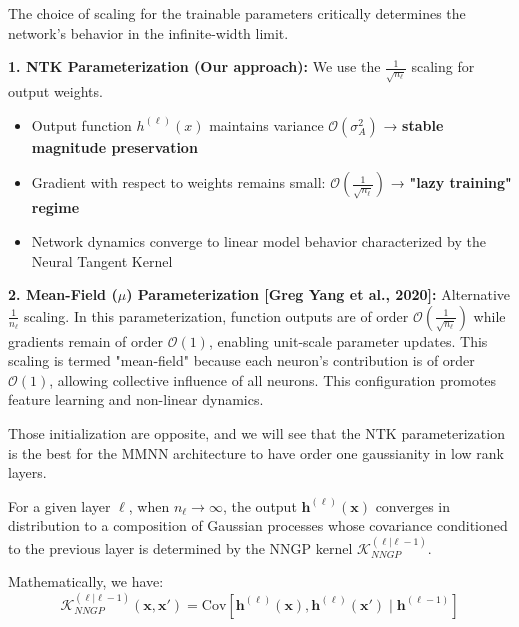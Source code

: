 \documentclass[a4paper]{article}
\theoremstyle{plain}
\theoremstyle{definition}
\theoremstyle{remark}
\begin{document}
\begin{tcolorbox}[colback=green!5,colframe=green!80!black,title={\textbf{Remark: Critical Parameterization Choice}},enhanced,drop shadow,boxrule=2pt]
The choice of scaling for the trainable parameters critically determines the network's behavior in the infinite-width limit. 

\textbf{1. NTK Parameterization (Our approach):} We use the $\frac{1}{\sqrt{n_\ell}}$ scaling for output weights.
\begin{itemize}
\item Output function $h^{(\ell)}(x)$ maintains variance $\mathcal{O}(\sigma_A^2)$ → \textbf{stable magnitude preservation}
\item Gradient with respect to weights remains small: $\mathcal{O}(\frac{1}{\sqrt{n_\ell}})$ → \textbf{"lazy training" regime}
\item Network dynamics converge to linear model behavior characterized by the Neural Tangent Kernel
\end{itemize}

\textbf{2. Mean-Field ($\mu$) Parameterization [Greg Yang et al., 2020]:} Alternative $\frac{1}{n_\ell}$ scaling.
In this parameterization, function outputs are of order $\mathcal{O}(\frac{1}{\sqrt{n_\ell}})$ while gradients remain of order $\mathcal{O}(1)$, enabling unit-scale parameter updates. This scaling is termed "mean-field" because each neuron's contribution is of order $\mathcal{O}(1)$, allowing collective influence of all neurons. This configuration promotes feature learning and non-linear dynamics.

Those initialization are opposite, and we will see that the NTK parameterization is the best for the MMNN architecture to have order one gaussianity in low rank layers.
\end{tcolorbox}






\begin{tcolorbox}[colback=yellow!5,colframe=yellow!80!black,title={\textbf{Definition: Neural Network Gaussian Process (NNGP)}},enhanced,drop shadow,boxrule=2pt]
For a given layer $\ell$, when $n_\ell \to \infty$, the output $\bm{h}^{(\ell)}(\bm{x})$ converges in 
distribution to a composition of Gaussian processes whose covariance conditioned to the previous layer is determined by the NNGP kernel $\mathcal{K}_{NNGP}^{(\ell | \ell-1)}$.

Mathematically, we have:
\begin{equation}
\mathcal{K}_{NNGP}^{(\ell | \ell-1 )}(\bm{x}, \bm{x}') = \text{Cov}\left[\bm{h}^{(\ell)}(\bm{x}), \bm{h}^{(\ell)}(\bm{x}') \mid \bm{h}^{(\ell-1)}\right]
\end{equation}
\end{tcolorbox}
\end{document}

